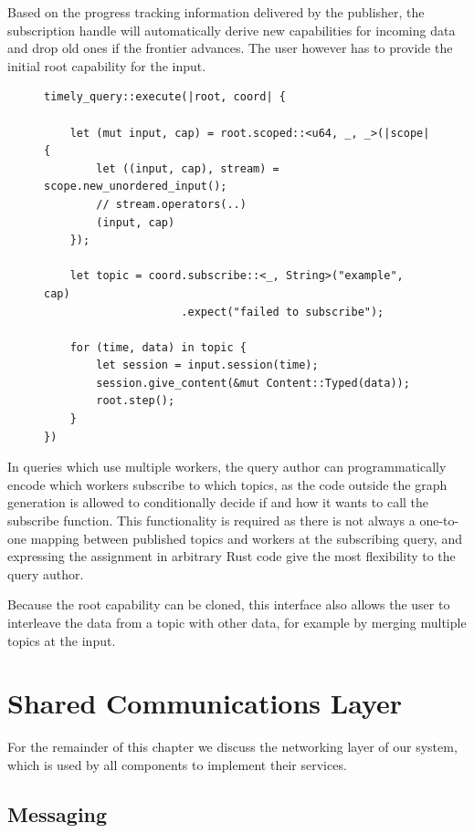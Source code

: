 Based on the progress tracking information delivered by the publisher, the
subscription handle will automatically derive new capabilities for incoming
data and drop old ones if the frontier advances. The user however has to
provide the initial root capability for the input.

\begin{figure}[h]
\begin{lstlisting}[caption={[Typical use of the subscription handle]
Typical use of the subscription handle. This query subscribes to a single topic of
strings, with \lstinline{u64} being the type of the timestamps.
}]
timely_query::execute(|root, coord| {

    let (mut input, cap) = root.scoped::<u64, _, _>(|scope| {
        let ((input, cap), stream) = scope.new_unordered_input();
        // stream.operators(..)
        (input, cap)
    });

    let topic = coord.subscribe::<_, String>("example", cap)
                     .expect("failed to subscribe");

    for (time, data) in topic {
        let session = input.session(time);
        session.give_content(&mut Content::Typed(data));
        root.step();
    }
})
\end{lstlisting}
\end{figure}

In queries which use multiple workers, the query author can programmatically
encode which workers subscribe to which topics, as the code outside the
graph generation is allowed to conditionally decide if and how it wants to call
the subscribe function. This functionality is required as there is not
always a one-to-one mapping between published topics and workers at the
subscribing query, and expressing the assignment in arbitrary Rust code
give the most flexibility to the query author.

Because the root capability can be cloned, this interface also allows the user to
interleave the data from a topic with other data, for example by merging
multiple topics at the input.

\section{Shared Communications Layer}

For the remainder of this chapter we discuss the networking layer of our system,
which is used by all components to implement their services.

\subsection{Messaging}

